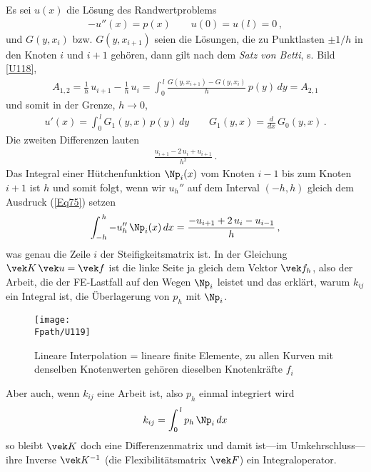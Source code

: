 {{{{{{{{Es sei $u(x)$ die L\"{o}sung des Randwertproblems
\begin{align}
- u''(x) = p(x) \qquad u(0) = u(l) = 0\,,
\end{align}
und $G(y,x_i)$ bzw. $G(y,x_{i +1}) $ seien die L\"{o}sungen, die zu Punktlasten $\pm 1/h$ in den Knoten $i$ und $i+1$ geh\"{o}ren, dann gilt nach dem {\em Satz von Betti\/}, s. Bild \ref{U118},
\begin{align}
A_{1,2} = \frac{1}{h} \,u_{i+1} - \frac{1}{h}\,u_i = \int_0^{\,l} \frac{G(y,x_{i +1}) - G(y,x_i)}{h}\, p(y)\,dy = A_{2,1}
\end{align}
und somit in der Grenze, $h \to 0$,
\begin{align}
u'(x) = \int_0^{\,l} G_1(y,x)\,p(y)\,dy \qquad G_1(y,x) = \frac{d}{dx}\,G_0(y,x)\,.
\end{align}
Die zweiten Differenzen lauten
\begin{align} \label{Eq75}
\frac{u_{i+1} - 2\,u_i + u_{i+1}}{h^2}\,.
\end{align}
Das Integral einer H\"{u}tchenfunktion $\Np_i(x)$ vom Knoten $i-1$ bis zum Knoten $i+1$ ist $h$ und somit folgt, wenn wir $u_h''$ auf dem Interval $(-h,h)$ gleich dem Ausdruck (\ref{Eq75})  setzen
\begin{align}
\int_{-h}^{\,h} - u_h''\,\Np_i(x)\,dx = \frac{-u_{i+1} + 2\,u_i - u_{i-1}}{h}\,,
\end{align}
was genau die Zeile $i$ der Steifigkeitsmatrix ist. In der Gleichung $\vek K\,\vek u = \vek f$ ist die linke Seite ja gleich dem Vektor $\vek f_h$, also der Arbeit, die der FE-Lastfall auf den Wegen $\Np_i$ leistet und das erkl\"{a}rt, warum $k_{ij}$ ein Integral ist, die \"{U}berlagerung von $p_h$ mit $\Np_i$.
\begin{figure}
\centering
\if {} \sidecaption[t] \fi
{\texttt{[image: \\Fpath/U119]}}
\caption{Lineare Interpolation = lineare finite Elemente, zu allen Kurven mit denselben Knotenwerten geh\"{o}ren dieselben Knotenkr\"{a}fte $f_i$}
\label{U119}%
\end{figure}%

Aber auch, wenn $k_{ij}$ eine Arbeit ist, also $p_h$ einmal integriert wird
\begin{align}
k_{ij} = \int_0^{\,l} p_h\,\Np_i\,dx
\end{align}
so bleibt $\vek K$ doch eine Differenzenmatrix und damit ist---im Umkehrschluss---ihre Inverse $\vek K^{-1}$ (die Flexibilit\"{a}tsmatrix $\vek F$) ein Integraloperator.

}}}}}}}}
